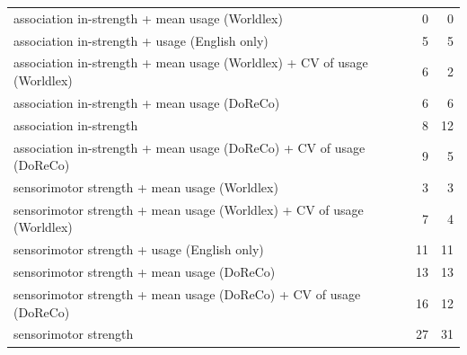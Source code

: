 \begin{table}[ht]
\begin{tabular}{lrr}
  association in-strength + mean usage (Worldlex) & 0 & 0 \\ 
  association in-strength + usage (English only) & 5 & 5 \\ 
  association in-strength + mean usage (Worldlex) + CV of usage (Worldlex) & 6 & 2 \\ 
  association in-strength + mean usage (DoReCo) & 6 & 6 \\ 
  association in-strength & 8 & 12 \\ 
  association in-strength + mean usage (DoReCo) + CV of usage (DoReCo) & 9 & 5 \\ 
  sensorimotor strength + mean usage (Worldlex) & 3 & 3 \\ 
  sensorimotor strength + mean usage (Worldlex) + CV of usage (Worldlex) & 7 & 4 \\ 
  sensorimotor strength + usage (English only) & 11 & 11 \\ 
  sensorimotor strength + mean usage (DoReCo) & 13 & 13 \\ 
  sensorimotor strength + mean usage (DoReCo) + CV of usage (DoReCo) & 16 & 12 \\ 
  sensorimotor strength & 27 & 31 \\ 
   \hline
\end{tabular}
\end{table}
